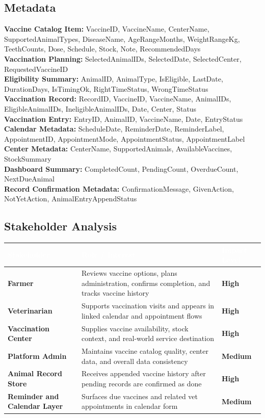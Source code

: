 \documentclass[12pt]{article}
\begin{document}
\subsection{Metadata}
\textbf{Vaccine Catalog Item:} VaccineID, VaccineName, CenterName, SupportedAnimalTypes, DiseaseName, AgeRangeMonths, WeightRangeKg, TeethCounts, Dose, Schedule, Stock, Note, RecommendedDays\\
\textbf{Vaccination Planning:} SelectedAnimalIDs, SelectedDate, SelectedCenter, RequestedVaccineID\\
\textbf{Eligibility Summary:} AnimalID, AnimalType, IsEligible, LastDate, DurationDays, IsTimingOk, RightTimeStatus, WrongTimeStatus\\
\textbf{Vaccination Record:} RecordID, VaccineID, VaccineName, AnimalIDs, EligibleAnimalIDs, IneligibleAnimalIDs, Date, Center, Status\\
\textbf{Vaccination Entry:} EntryID, AnimalID, VaccineName, Date, EntryStatus\\
\textbf{Calendar Metadata:} ScheduleDate, ReminderDate, ReminderLabel, AppointmentID, AppointmentMode, AppointmentStatus, AppointmentLabel\\
\textbf{Center Metadata:} CenterName, SupportedAnimals, AvailableVaccines, StockSummary\\
\textbf{Dashboard Summary:} CompletedCount, PendingCount, OverdueCount, NextDueAnimal\\
\textbf{Record Confirmation Metadata:} ConfirmationMessage, GivenAction, NotYetAction, AnimalEntryAppendStatus

\subsection{Stakeholder Analysis}

\begin{longtable}{|p{3cm}|p{6cm}|p{3cm}|}
\hline
\rowcolor{headerblue}\textcolor{white}{\textbf{Stakeholder}} & \textcolor{white}{\textbf{Role / Interest}} & \textcolor{white}{\textbf{Impact Level}} \\
\hline
\textbf{Farmer} & Reviews vaccine options, plans administration, confirms completion, and tracks vaccine history & \textbf{High} \\
\hline
\rowcolor{rowgray}
\textbf{Veterinarian} & Supports vaccination visits and appears in linked calendar and appointment flows & \textbf{High} \\
\hline
\textbf{Vaccination Center} & Supplies vaccine availability, stock context, and real-world service destination & \textbf{High} \\
\hline
\rowcolor{rowgray}
\textbf{Platform Admin} & Maintains vaccine catalog quality, center data, and overall data consistency & \textbf{Medium} \\
\hline
\textbf{Animal Record Store} & Receives appended vaccine history after pending records are confirmed as done & \textbf{High} \\
\hline
\rowcolor{rowgray}
\textbf{Reminder and Calendar Layer} & Surfaces due vaccines and related vet appointments in calendar form & \textbf{Medium} \\
\hline
\end{longtable}
\end{document}
